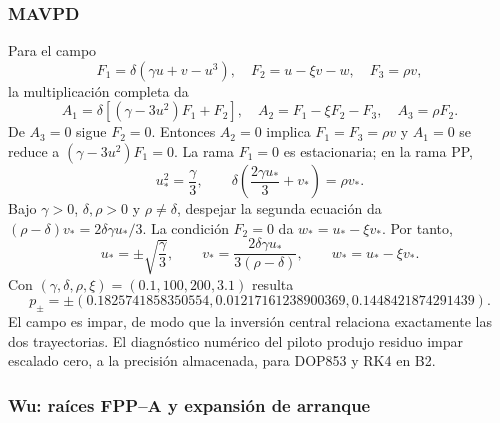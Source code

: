 \subsubsection{MAVPD}

Para el campo
\begin{equation}
 F_1=\delta(\gamma u+v-u^3),\quad
 F_2=u-\xi v-w,\quad F_3=\rho v,
 \label{pilot:eq-mavpd-field}
\end{equation}
la multiplicación completa da
\begin{equation}
 A_1=\delta[(\gamma-3u^2)F_1+F_2],\quad
 A_2=F_1-\xi F_2-F_3,
 \quad A_3=\rho F_2.
 \label{pilot:eq-mavpd-acceleration}
\end{equation}
De $A_3=0$ sigue $F_2=0$. Entonces $A_2=0$ implica $F_1=F_3=\rho v$ y
$A_1=0$ se reduce a
$(\gamma-3u^2)F_1=0$. La rama $F_1=0$ es estacionaria; en la rama PP,
\begin{equation}
 u_*^2=\frac\gamma3,\qquad
 \delta\left(\frac{2\gamma u_*}{3}+v_*\right)=\rho v_*.
\end{equation}
Bajo \(\gamma>0\), \(\delta,\rho>0\) y \(\rho\ne\delta\), despejar la
segunda ecuación da \((\rho-\delta)v_*=2\delta\gamma u_*/3\). La condición
\(F_2=0\) da \(w_*=u_*-\xi v_*\). Por tanto,
\begin{equation}
 u_*=\pm\sqrt{\frac\gamma3},\qquad
 v_*=\frac{2\delta\gamma u_*}{3(\rho-\delta)},
 \qquad w_*=u_*-\xi v_*.
 \label{pilot:eq-mavpd-pp-derived}
\end{equation}
Con $(\gamma,\delta,\rho,\xi)=(0.1,100,200,3.1)$ resulta
\begin{equation}
 p_\pm=\pm(0.1825741858350554,
 0.01217161238900369,0.1448421874291439).
 \label{pilot:eq-mavpd-pp-numeric}
\end{equation}
El campo es impar, de modo que la inversión central relaciona exactamente las
dos trayectorias. El diagnóstico numérico del piloto produjo residuo impar
escalado cero, a la precisión almacenada, para DOP853 y RK4 en B2.

\subsubsection{Wu: raíces FPP--A y expansión de arranque}

